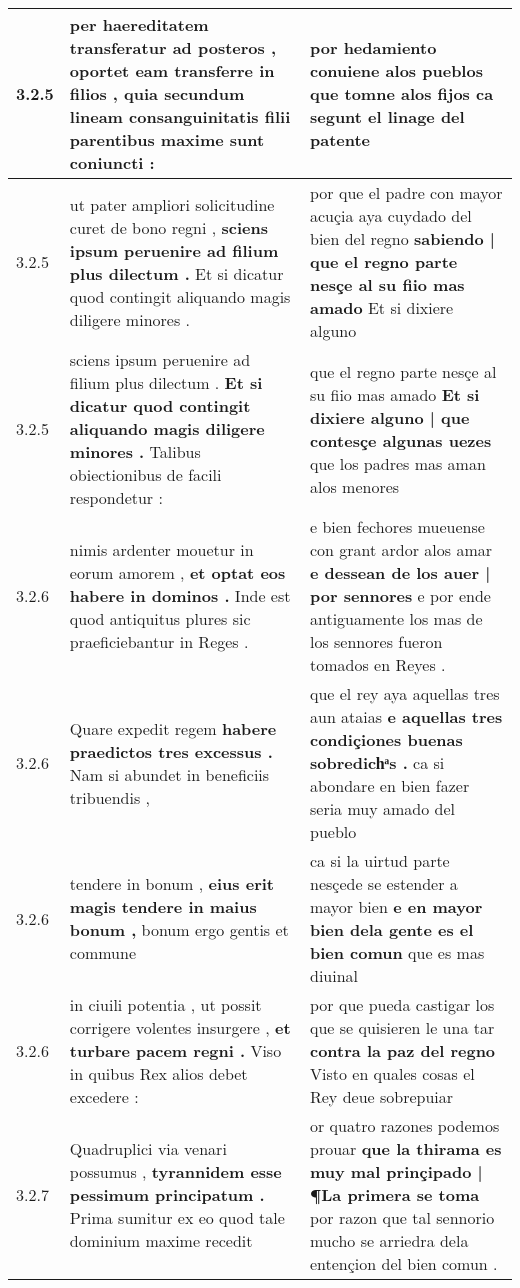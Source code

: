 \begin{tabular}{|p{1cm}|p{6.5cm}|p{6.5cm}|}
3.2.5 & per haereditatem transferatur ad posteros , \textbf{ oportet eam transferre in filios , } quia secundum lineam consanguinitatis filii parentibus maxime sunt coniuncti : & por hedamiento conuiene alos pueblos \textbf{ que tomne alos fijos } ca segunt el linage del patente \\\hline
3.2.5 & ut pater ampliori solicitudine curet de bono regni , \textbf{ sciens ipsum peruenire ad filium plus dilectum . } Et si dicatur quod contingit aliquando magis diligere minores . & por que el padre con mayor acuçia aya cuydado del bien del regno \textbf{ sabiendo | que el regno parte nesçe al su fiio mas amado } Et si dixiere alguno \\\hline
3.2.5 & sciens ipsum peruenire ad filium plus dilectum . \textbf{ Et si dicatur quod contingit aliquando magis diligere minores . } Talibus obiectionibus de facili respondetur : & que el regno parte nesçe al su fiio mas amado \textbf{ Et si dixiere alguno | que contesçe algunas uezes } que los padres mas aman alos menores \\\hline
3.2.6 & nimis ardenter mouetur in eorum amorem , \textbf{ et optat eos habere in dominos . } Inde est quod antiquitus plures sic praeficiebantur in Reges . & e bien fechores mueuense con grant ardor alos amar \textbf{ e dessean de los auer | por sennores } e por ende antiguamente los mas de los sennores fueron tomados en Reyes . \\\hline
3.2.6 & Quare expedit regem \textbf{ habere praedictos tres excessus . } Nam si abundet in beneficiis tribuendis , & que el rey aya aquellas tres aun ataias \textbf{ e aquellas tres condiçiones buenas sobredichͣs . } ca si abondare en bien fazer seria muy amado del pueblo \\\hline
3.2.6 & tendere in bonum , \textbf{ eius erit magis tendere in maius bonum , } bonum ergo gentis et commune & ca si la uirtud parte nesçede se estender a mayor bien \textbf{ e en mayor bien dela gente es el bien comun } que es mas diuinal \\\hline
3.2.6 & in ciuili potentia , ut possit corrigere volentes insurgere , \textbf{ et turbare pacem regni . } Viso in quibus Rex alios debet excedere : & por que pueda castigar los que se quisieren le una tar \textbf{ contra la paz del regno } Visto en quales cosas el Rey deue sobrepuiar \\\hline
3.2.7 & Quadruplici via venari possumus , \textbf{ tyrannidem esse pessimum principatum . } Prima sumitur ex eo quod tale dominium maxime recedit & or quatro razones podemos prouar \textbf{ que la thirama es muy mal prinçipado | ¶La primera se toma } por razon que tal sennorio mucho se arriedra dela entençion del bien comun . \\\hline

\end{tabular}
